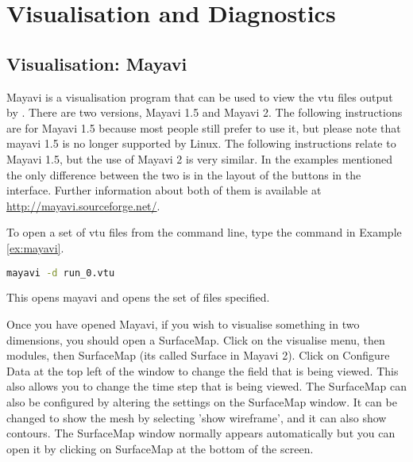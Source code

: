 \chapter{Visualisation and Diagnostics}
\label{chap:visualisation_and_diagnostics}



\section{Visualisation: Mayavi}
\label{sect:mayavi}

Mayavi is a visualisation program that can be used to view the vtu files output by \fluidity. There are two versions, Mayavi 1.5 and Mayavi 2.   The following instructions are for Mayavi 1.5 because  most people still prefer to use it, but please note that mayavi 1.5 is no longer supported by Linux. The following instructions relate to Mayavi 1.5, but the use of Mayavi 2 is very similar. In the examples mentioned the only difference between the two is in the layout of the buttons in the interface. Further information about both of them is available at \url{http://mayavi.sourceforge.net/}.

To open a set of vtu files from the command line, type the command in Example \ref{ex:mayavi}.

\begin{example}
  \begin{lstlisting}[language=bash]
mayavi -d run_0.vtu
\end{lstlisting}
  \caption{This opens mayavi and opens the set of files specified.}
\label{ex:mayavi}
\end{example}

Once you have opened Mayavi, if you wish to visualise something in two dimensions, you should open a SurfaceMap. Click on the visualise menu, then modules, then SurfaceMap (its called Surface in Mayavi 2). Click on Configure Data at the top left of the window to change the field that is being viewed. This also allows you to change the time step that is being viewed.  The SurfaceMap can also be configured by altering the settings on the SurfaceMap window. It can be changed to show the mesh by selecting 'show wireframe', and it can also show contours. The SurfaceMap window normally appears automatically but you can open it by clicking on SurfaceMap at the bottom of the screen. 

